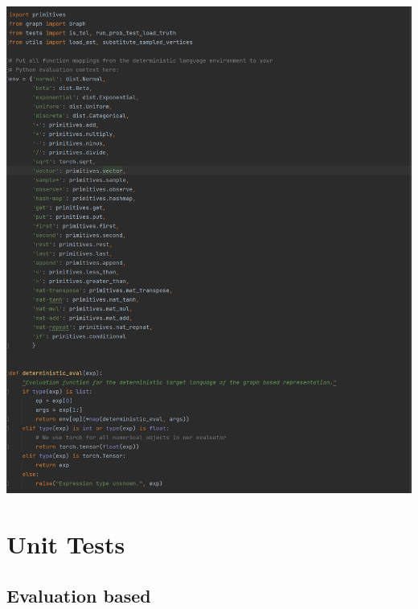 \documentclass[10pt]{homeworg}
\begin{document}
\begin{center}
\includegraphics[scale=0.5]{figures/deterministic_eval.png}
\end{center}


\section{Unit Tests}
\subsection{Evaluation based}
\end{document}
